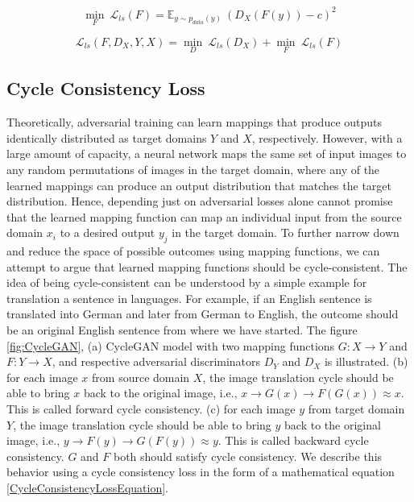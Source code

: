     \begin{equation}\label{lsgan5}        
        \underset{F}{\min}\ \mathcal{L}_{ls}(F) = \mathbb{E}_{y \sim p_{data}(y)}\ (D_X(F(y)) - c)^2
    \end{equation}
    
    
    \begin{equation}\label{lsgan6}        
        \mathcal{L}_{ls}(F, D_X, Y, X) = \underset{D}{\min}\ \mathcal{L}_{ls}(D_X) + \underset{F}{\min}\ \mathcal{L}_{ls}(F)
    \end{equation}
    

\subsection{Cycle Consistency Loss}\label{CycleConsistencyLoss}

Theoretically, adversarial training can learn mappings that produce outputs identically distributed as target domains $Y$ and $X$, respectively. However, with a large amount of capacity, a neural network maps the same set of input images to any random permutations of images in the target domain,  where any of the learned mappings can produce an output distribution that matches the target distribution. Hence, depending just on adversarial losses alone cannot promise that the learned mapping function can map an individual input from the source domain $x_i$ to a desired output $y_j$ in the target domain. 
To further narrow down and reduce the space of possible outcomes using mapping functions, we can attempt to argue that learned mapping functions should be cycle-consistent. The idea of being cycle-consistent can be understood by a simple example for translation a sentence in languages. For example, if an English sentence is translated into German and later from German to English, the outcome should be an original English sentence from where we have started. The figure \ref{fig:CycleGAN}, (a) \ac{CycleGAN} model with two mapping functions $G : X \rightarrow Y$ and $F : Y \rightarrow X$, and respective adversarial discriminators $D_Y$ and $D_X$ is illustrated. (b) for each image $x$ from source domain $X$, the image translation cycle should be able to bring $x$ back to the original image, i.e., $x \rightarrow G(x) \rightarrow F(G(x)) \approx x$. This is called forward cycle consistency. (c) for each image $y$ from target domain $Y$, the image translation cycle should be able to bring $y$ back to the original image, i.e., $y \rightarrow F(y) \rightarrow G(F(y)) \approx y$. This is called backward cycle consistency. $G$ and $F$ both should satisfy cycle consistency. We describe this behavior using a cycle consistency loss in the form of a mathematical equation \ref{CycleConsistencyLossEquation}.

